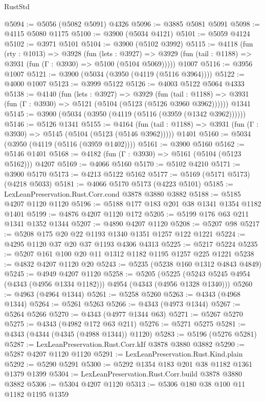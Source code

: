 \begin{lexlean}{RustStd}
\begin{coremodule}
@5094 := @5056 (@5082 @5091) @4326
@5096 := @3885 @5081 @5091
@5098 := @4115 @5080 @1175
@5100 := @3900 (@5034 @4121)
@5101 := @5059 @4124
@5102 := @3971 @5101
@5104 := @3900 (@5102 @3992)
@5115 := @4118
    (fun (rty : @1013) =>
    @3928
      (fun (lets : @3927) =>
      @3929 (fun (tail : @1188) => @3931 (fun (Γ : @3930) => @5100 (@5104 @5069)))))
    @1007
@5116 := @3956 @1007
@5121 := @3900 (@5034 (@3950 (@4119 (@5116 @3964))))
@5122 := @4000 @1007
@5123 := @3999 @5122
@5126 := @4003 @5122 @5064 @4333
@5138 := @4140
    (fun (lets : @3927) =>
    @3929
      (fun (tail : @1188) => @3931 (fun (Γ : @3930) => @5121 (@5104 (@5123 (@5126 @3960 @3962))))))
    @1341
@5145 := @3900 (@5034 (@3950 (@4119 (@5116 (@3959 (@1342 @3962))))))
@5146 := @5126 @1341
@5155 := @4164
    (fun (tail : @1188) => @3931 (fun (Γ : @3930) => @5145 (@5104 (@5123 (@5146 @3962)))))
    @1401
@5160 := @5034 (@3950 (@4119 (@5116 (@3959 @1402))))
@5161 := @3900 @5160
@5162 := @5146 @1401
@5168 := @4182 (fun (Γ : @3930) => @5161 (@5104 (@5123 @5162))) @4207
@5169 := @4066 @5160
@5170 := @5102 @4210
@5171 := @3900 @5170
@5173 := @4213 @5122 @5162
@5177 := @5169 (@5171 @5173) (@4218 @5033)
@5181 := @4066 @5170 @5173 (@4223 @5101)
@5185 := LexLeanPreservation.Rust.Corr.cond @3878 @3880 @3882
@5188 := @5185 @4207 @1120 @1120
@5196 := @5188 @177 @183 @201 @38 @1341 @1354 @1182 @1401
@5199 := @4876 @4207 @1120 @172
@5205 := @5199 @176 @63 @211 @1341 @1352 @1344
@5207 := @4890 @4207 @1120
@5208 := @5207 @98
@5217 := @5208 @175 @20 @22 @1193 @1340 @1351 @1257 @122 @1221
@5224 := @4295 @1120 @37 @20 @37 @1193 @4306 @4313
@5225 := @5217 @5224
@5235 := @5207 @161 @100 @20 @11 @1312 @1182 @1195 @1257 @225 @1221
@5238 := @4832 @4207 @1120 @20
@5243 := @5235 (@5238 @160 @1312 @4843 @4849)
@5245 := @4949 @4207 @1120
@5258 := @5205
    (@5225 (@5243 @5245 @4954 (@4343 (@4956 @1334 @1182))) @4954 (@4343 (@4956 @1328 @1340)))
@5260 := @4963 (@4964 @1344)
@5261 := @5258 @5260
@5263 := @4343 (@4968 @1344)
@5264 := @5261 @5263
@5266 := @4343 (@4973 @1344)
@5267 := @5264 @5266
@5270 := @4343 (@4977 @1344 @63)
@5271 := @5267 @5270
@5275 := @4343 (@4982 @172 @63 @211)
@5276 := @5271 @5275
@5281 := @4343 (@4344 (@4345 (@4988 @1344)) @1120)
@5283 := @5196 (@5276 @5281)
@5287 := LexLeanPreservation.Rust.Corr.kIf @3878 @3880 @3882
@5290 := @5287 @4207 @1120 @1120
@5291 := LexLeanPreservation.Rust.Kind.plain
@5292 := @5290 @5291
@5300 := @5292 @1354 @183 @201 @38 @1182 @1361 @1379 @1399
@5304 := LexLeanPreservation.Rust.Corr.build @3878 @3880 @3882
@5306 := @5304 @4207 @1120
@5313 := @5306 @180 @38 @100 @11 @1182 @1195 @1359

\end{coremodule}
\end{lexlean}
